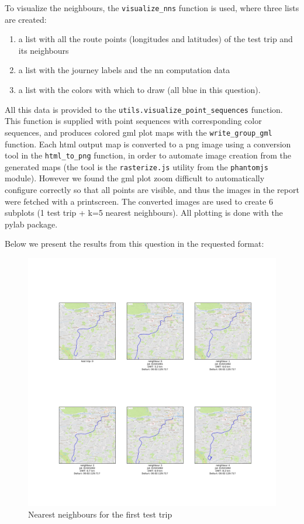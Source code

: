 \documentclass[12pt]{article}
\begin{document}
	
  To visualize the neighbours, the \texttt{visualize\_nns}
  function is used, where three lists are created:
  \begin{enumerate}
    \item a list with all the route points (longitudes and latitudes) of the
      test trip and its neighbours
    \item a list with the journey labels and the nn computation data
      \item a list with the colors with which to draw (all blue in this
        question).
      \end{enumerate}
      All this data is provided to the
      \texttt{utils.visualize\_point\_sequences} function. This function is
      supplied with point sequences with corresponding color sequences, and
      produces colored gml plot maps with the \texttt{write\_group\_gml}
      function. Each html output map is converted to a png image using a conversion tool in the \texttt{html\_to\_png} function, in
order to automate image creation from the generated maps (the tool is the
\texttt{rasterize.js} utility from the \texttt{phantomjs} module).
However we found the gml plot zoom difficult to automatically configure correctly so that
all points are visible, and thus the images in the report were fetched with a printscreen.
The converted images are used to create 6 subplots (1 test trip + k=5 nearest
neighbours). All plotting is done with the pylab package.

	Below we present the results from this question in the requested format:
	
	\begin{figure} [H]
		\begin{center}
			\includegraphics [scale = 0.40] {nn1.jpg}
			\caption{Nearest neighbours for the first test trip}
		\end{center}
	\end{figure} 
\end{document}
